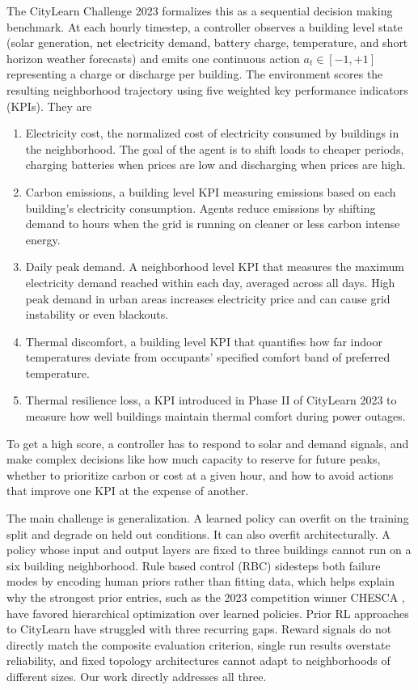 \documentclass{article}
\begin{document}
The CityLearn Challenge 2023 \citep{citylearn2023} formalizes this as a sequential decision making benchmark. At each hourly timestep, a controller observes a building level state (solar generation, net electricity demand, battery charge, temperature, and short horizon weather forecasts) and emits one continuous action $a_t \in [-1, +1]$ representing a charge or discharge per building. The environment scores the resulting neighborhood trajectory using five weighted key performance indicators (KPIs). They are
\begin{enumerate}
    \item Electricity cost, the normalized cost of electricity consumed by buildings in the neighborhood. The goal of the agent is to shift loads to cheaper periods, charging batteries when prices are low and discharging when prices are high.
    \item Carbon emissions, a building level KPI measuring emissions based on each building's electricity consumption. Agents reduce emissions by shifting demand to hours when the grid is running on cleaner or less carbon intense energy. 
    \item Daily peak demand. A neighborhood level KPI that measures the maximum electricity demand reached within each day, averaged across all days. High peak demand in urban areas increases electricity price and can cause grid instability or even blackouts.
    \item Thermal discomfort, a building level KPI that quantifies how far indoor temperatures deviate from occupants' specified comfort band of preferred temperature.
    \item Thermal resilience loss, a KPI introduced in Phase II of CityLearn 2023 to measure how well buildings maintain thermal comfort during power outages.
\end{enumerate}
To get a high score, a controller has to respond to solar and demand signals, and make complex decisions like how much capacity to reserve for future peaks, whether to prioritize carbon or cost at a given hour, and how to avoid actions that improve one KPI at the expense of another.

The main challenge is generalization. A learned policy can overfit on the training split and degrade on held out conditions. It can also overfit architecturally. 
A policy whose input and output layers are fixed to three buildings cannot run on a six building neighborhood. Rule based control (RBC) sidesteps both failure modes by encoding human priors rather than fitting data, which helps explain why the strongest prior entries, such as the 2023 competition winner CHESCA \citep{pinto2024citylearn}, have favored hierarchical optimization over learned policies. Prior RL approaches to CityLearn have struggled with three recurring gaps. Reward signals do not directly match the composite evaluation criterion, single run results overstate reliability, and fixed topology architectures cannot adapt to neighborhoods of different sizes. Our work directly addresses all three.
\end{document}
